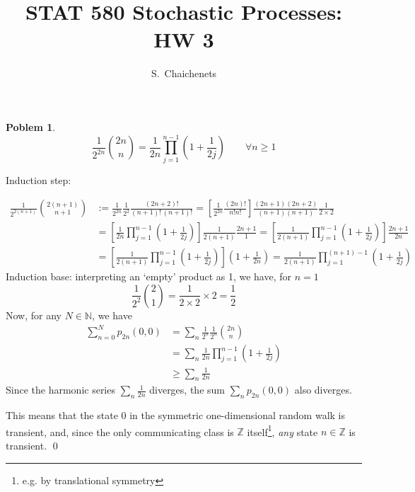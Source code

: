 \documentclass[8pt,notitlepage]{report}
\newtheorem{problem}{Poblem}
\newenvironment{solution}[1][Solution]{\begin{trivlist}
    \item[\hskip \labelsep {\bfseries #1}]}{\end{trivlist}}
\begin{document}
\title{STAT 580 Stochastic Processes: HW 3}
\author{ S.\ Chaichenets }
\maketitle



\begin{problem}
\small
\begin{equation}
\frac{1}{2^{2n}} {2n \choose n} = \frac{1}{2n} \prod_{j=1}^{n-1} \left(1+\frac{1}{2j}\right)
\qquad \forall n\geq 1
\end{equation}
\normalsize
\end{problem}

\begin{solution}
Induction step:

\begin{equation}
\begin{split}
\frac{1}{2^{2(n+1)}} {2(n+1) \choose n+1} 
	& := \frac{1}{2^{2n}}\frac{1}{2^2} \frac{(2n+2)!}{(n+1)!\,(n+1)!} 
	 = \left[ \frac{1}{2^{2n}}\frac{(2n)!}{n!n!} \right]
		\frac{(2n+1)(2n+2)}{(n+1)(n+1)}\frac{1}{2\times2} 			\\
	& = \left[ \frac{1}{2n}\prod_{j=1}^{n-1} \left(1+\frac{1}{2j}\right) \right]
		\frac{1}{2(n+1)}\frac{2n+1}{1} 
	 = \left[ \frac{1}{2(n+1)}\prod_{j=1}^{n-1} \left(1+\frac{1}{2j}\right) \right]
		\frac{2n+1}{2n}								\\
	& = \left[ \frac{1}{2(n+1)}\prod_{j=1}^{n-1} \left(1+\frac{1}{2j}\right) \right]
		\left( 1 + \frac{1}{2n} \right)
	 = \frac{1}{2(n+1)}\prod_{j=1}^{(n+1)-1} \left(1+\frac{1}{2j}\right)
\end{split}
\end{equation}
Induction base: interpreting an `empty' product as 1, we have, for $n=1$
$$
\frac{1}{2^2}{2 \choose 1} = \frac{1}{2\times2} \times 2 = \frac{1}{2}
$$
Now, for any $N\in \mathbb{N}$, we have
\begin{equation}
\begin{split}
\sum_{n=0}^{N} p_{2n}(0,0) &= \sum_n \frac{1}{2^n}\frac{1}{2^n}{2n \choose n}		\\
			&= \sum_n {\frac{1}{2n} \prod_{j=1}^{n-1} \left(1+\frac{1}{2j}\right)}	\\
			&\geq	\sum_{n}\frac{1}{2n}
\end{split}
\end{equation}
Since the harmonic series $\sum_n \frac{1}{2n}$ diverges, 
the sum $\sum_{n} p_{2n}(0,0)$ also diverges.

This means that the state $0$ in the symmetric one-dimensional random walk is transient,
and, since the only communicating class is $\mathbb{Z}$ itself\footnote{
	e.g. by translational symmetry
}, {\it any} state $n\in \mathbb{Z}$ is transient.
\qed
\end{solution}
\end{document}
